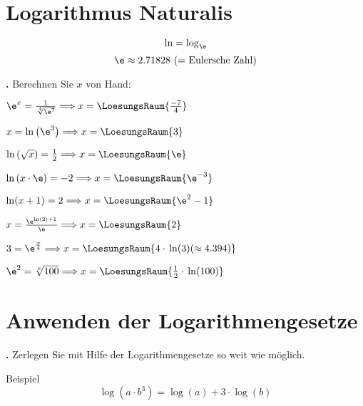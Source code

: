 \newpage

\section{Logarithmus Naturalis}

$$\ln = \log_{\e}$$
$$\e \approx 2.71828 \text{ (= Eulersche Zahl)}$$



\textbf{\bbwAufgabenNummer{}.}
Berechnen Sie $x$ von Hand:

\begin{bbwAufgabenBlock}
\item $\e^x = \frac1{\sqrt[4]{\e^7}}  \Longrightarrow x =    \LoesungsRaum{\frac{-7}4}$
\item $x = \ln\left(\e^3\right)  \Longrightarrow x =    \LoesungsRaum{3}$
\item $\ln\left(\sqrt{x}\right)  = \frac12  \Longrightarrow x =    \LoesungsRaum{\e}$
\item $\ln\left(x\cdot{} \e \right)  = -2  \Longrightarrow x =    \LoesungsRaum{\e^{-3}}$
\seitenUmbruchImAufgabenteil{}
\item $\ln(x+1) = 2 \Longrightarrow x =    \LoesungsRaum{\e^2 - 1}$
\item $x=\frac{\e^{\ln(2)+1}}{\e} \Longrightarrow x =    \LoesungsRaum{2}$
\item $3 = \e^{\frac{x}4} \Longrightarrow x=    \LoesungsRaum{4\cdot{} \ln(3) (\approx 4.394)}$
\item $\e^2 = \sqrt[x]{100} \Longrightarrow x= \LoesungsRaum{\frac12\cdot{}\ln(100)}$
\end{bbwAufgabenBlock}

\newpage

\section{Anwenden der Logarithmengesetze}

\textbf{\bbwAufgabenNummer{}.}
Zerlegen Sie mit Hilfe der Logarithmengesetze so weit wie möglich.

Beispiel $$\log\left(a\cdot{}b^3\right) = \log(a) + 3\cdot{}\log(b)$$

